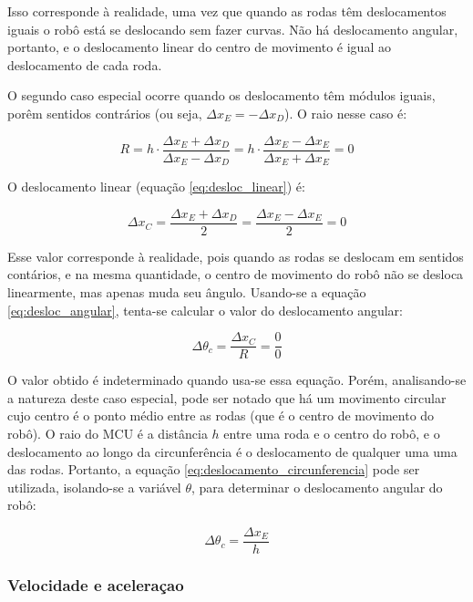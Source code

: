 Isso corresponde à realidade, uma vez que quando as rodas têm deslocamentos iguais o robô está se deslocando sem fazer curvas. Não há deslocamento angular, portanto, e o deslocamento linear do centro de movimento é igual ao deslocamento de cada roda.

O segundo caso especial ocorre quando os deslocamento têm módulos iguais, porêm sentidos contrários (ou seja, $\Delta x_E = - \Delta x_D$). O raio nesse caso é:

\begin{equation}
  R = h \cdot \frac{\Delta x_E + \Delta x_D} {\Delta x_E - \Delta x_D} = h \cdot \frac{\Delta x_E - \Delta x_E}{\Delta x_E + \Delta x_E} = 0
    \label{eq:caso_especial2_R}
\end{equation}


O deslocamento linear (equação \ref{eq:desloc_linear}) é:

\begin{equation}
  \Delta x_C = \frac{\Delta x_E + \Delta x_D}{2} = \frac{\Delta x_E - \Delta x_E}{2} = 0
  \label{eq:caso_especial2_x}
\end{equation}

Esse valor corresponde à realidade, pois quando as rodas se deslocam em sentidos contários, e na mesma quantidade, o centro de movimento do robô não se desloca linearmente, mas apenas muda seu ângulo.
Usando-se a equação \ref{eq:desloc_angular}, tenta-se calcular o valor do deslocamento angular:

\begin{equation}
  \Delta \theta_c = \frac{\Delta x_C}{R} = \frac{0}{0}
  \label{eq:caso_especial2_theta}
\end{equation}

O valor obtido é indeterminado quando usa-se essa equação. Porém, analisando-se a natureza deste caso especial, pode ser notado que há um movimento circular cujo centro é o ponto médio entre as rodas (que é o centro de movimento do robô). O raio do MCU é a distância $h$ entre uma roda e o centro do robô, e o deslocamento ao longo da circunferência é o deslocamento de qualquer uma uma das rodas. Portanto, a equação \ref{eq:deslocamento_circunferencia} pode ser utilizada, isolando-se a variável $\theta$, para determinar o deslocamento angular do robô:

\begin{equation}
  \Delta \theta_c = \frac{\Delta x_E}{h}
  \label{eq:caso_especial2_theta2}
\end{equation}


\subsubsection{Velocidade e aceleraçao}

